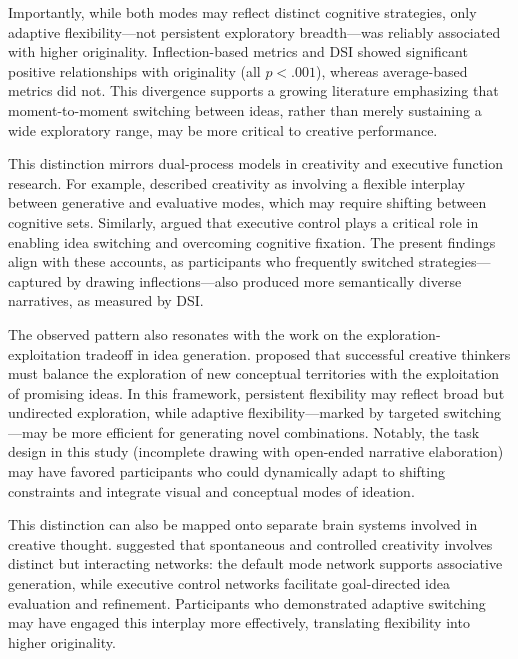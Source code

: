 \documentclass[../MA_Thesis.tex]{subfiles}
\begin{document}
Importantly, while both modes may reflect distinct cognitive strategies, only adaptive flexibility—not persistent exploratory breadth—was reliably associated with higher originality. Inflection-based metrics and DSI showed significant positive relationships with originality (all $p < .001$), whereas average-based metrics did not. This divergence supports a growing literature emphasizing that moment-to-moment switching between ideas, rather than merely sustaining a wide exploratory range, may be more critical to creative performance.

This distinction mirrors dual-process models in creativity and executive function research. For example, \textcite{sowden_shifting_2015} described creativity as involving a flexible interplay between generative and evaluative modes, which may require shifting between cognitive sets. Similarly, \textcite{nusbaum_emily_c_and_silvia_paul_j_individual_2019} argued that executive control plays a critical role in enabling idea switching and overcoming cognitive fixation. The present findings align with these accounts, as participants who frequently switched strategies—captured by drawing inflections—also produced more semantically diverse narratives, as measured by DSI.

The observed pattern also resonates with the work on the exploration-exploitation tradeoff in idea generation. \textcite{hills_exploration_2015} proposed that successful creative thinkers must balance the exploration of new conceptual territories with the exploitation of promising ideas. In this framework, persistent flexibility may reflect broad but undirected exploration, while adaptive flexibility—marked by targeted switching—may be more efficient for generating novel combinations. Notably, the task design in this study (incomplete drawing with open-ended narrative elaboration) may have favored participants who could dynamically adapt to shifting constraints and integrate visual and conceptual modes of ideation.

This distinction can also be mapped onto separate brain systems involved in creative thought. \textcite{beaty_creative_2016} suggested that spontaneous and controlled creativity involves distinct but interacting networks: the default mode network supports associative generation, while executive control networks facilitate goal-directed idea evaluation and refinement. Participants who demonstrated adaptive switching may have engaged this interplay more effectively, translating flexibility into higher originality.
\end{document}
